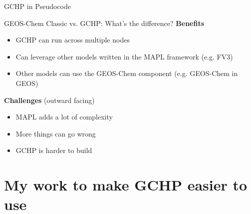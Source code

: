 \documentclass[10pt]{beamer}
\begin{document}
\begin{frame}[fragile]{GCHP in Pseudocode}
\end{frame}

\begin{frame}[fragile]{GEOS-Chem Classic vs. GCHP: What’s the difference?}
    \textbf{Benefits}
    \footnotesize
    \begin{itemize}
        \item GCHP can run across multiple nodes
        \item Can leverage other models written in the MAPL framework (e.g. FV3)
        \item Other models can use the GEOS-Chem component (e.g. GEOS-Chem in GEOS)
    \end{itemize}
    \vfill
    \normalsize
    \textbf{Challenges} (outward facing)
    \footnotesize
    \begin{itemize}
        \item MAPL adds a lot of complexity
        \item More things can go wrong
        \item GCHP is harder to build
    \end{itemize}
\end{frame}

\section{My work to make GCHP easier to use}
\end{document}
